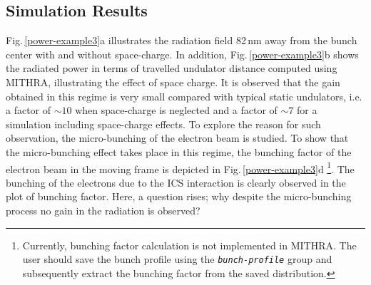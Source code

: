 \subsection{Simulation Results}

Fig.\,\ref{power-example3}a illustrates the radiation field 82\,nm away from the bunch center with and without space-charge.
%
In addition, Fig.\,\ref{power-example3}b shows the radiated power in terms of travelled undulator distance computed using MITHRA, illustrating the effect of space charge.
%
It is observed that the gain obtained in this regime is very small compared with typical static undulators, i.e. a factor of $\sim10$ when space-charge is neglected and a factor of $\sim7$ for a simulation including space-charge effects.
%
To explore the reason for such observation, the micro-bunching of the electron beam is studied.
%
To show that the micro-bunching effect takes place in this regime, the bunching factor of the electron beam in the moving frame is depicted in Fig.\,\ref{power-example3}d \footnote{Currently, bunching factor calculation is not implemented in MITHRA. The user should save the bunch profile using the {\tt \em \footnotesize bunch-profile} group and subsequently extract the bunching factor from the saved distribution.}.
%
The bunching of the electrons due to the ICS interaction is clearly observed in the plot of bunching factor.
%
Here, a question rises; why despite the micro-bunching process no gain in the radiation is observed?

